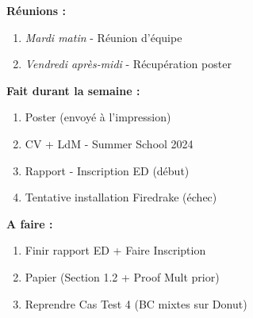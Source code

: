 \textbf{Réunions :}
\begin{enumerate}[label=\textbullet]
	\item \textit{Mardi matin} - Réunion d'équipe
	\item \textit{Vendredi après-midi} - Récupération poster
\end{enumerate}
\textbf{Fait durant la semaine :}
\begin{enumerate}[label=\textbullet]
	\item Poster (envoyé à l'impression)
	\item CV + LdM - Summer School 2024
	\item Rapport - Inscription ED (début)
	\item Tentative installation Firedrake (échec)
\end{enumerate}
\textbf{A faire :}
\begin{enumerate}[label=\textbullet]
	\item Finir rapport ED + Faire Inscription
	\item Papier (Section 1.2 + Proof Mult prior)
	\item Reprendre Cas Test 4 (BC mixtes sur Donut)
\end{enumerate}